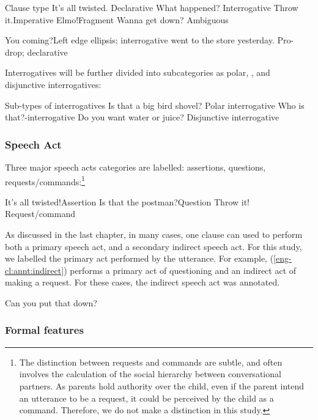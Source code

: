 Clause type
\bxl
\label{eng-cl:annt:decl}
It’s all twisted. \hfill Declarative
\ex \label{eng-cl:annt:int} What happened?	\hfill Interrogative
\ex \label{eng-cl:annt:imp} Throw it.\hfill Imperative
\ex \label{eng-cl:annt:frag}	Elmo!\hfill	Fragment
\ex \label{eng-cl:annt:amb} Wanna get down?	\hfill Ambiguous
\exl
\eex

\bxl{} You coming?\hfill Left edge ellipsis; interrogative
\ex went to the store yesterday. \hfill	Pro-drop; declarative
\exl
\eex

Interrogatives will be further divided into subcategories as polar, \twh, and disjunctive interrogatives:

	Sub-types of interrogatives
\bxl{}
Is that a big bird shovel? \hfill	Polar interrogative
\ex	Who is that?\hfill	\twh-interrogative
\ex	Do you want water or juice? \hfill Disjunctive interrogative
\exl
\eex

\subsubsection{Speech Act}

Three major speech acts categories are labelled: assertions, questions, requests/commands:\footnote{The distinction between requests and commands are subtle, and often involves the calculation of the social hierarchy between conversational partners. As parents hold authority over the child, even if the parent intend an utterance to be a request, it could be perceived by the child as a command. Therefore, we do not make a distinction in this study.}

\bxl{} It’s all twisted!\hfill	Assertion
\ex Is that the postman?\hfill		Question
\ex Throw it!	\hfill		Request/command
\exl
\eex

As discussed in the last chapter, in many cases, one clause can used to perform both a primary speech act, and a secondary indirect speech act. For this study, we labelled the primary act performed by the utterance. For example, (\ref{eng-cl:annt:indirect}) performs a primary act of questioning and an indirect act of making a request. For these cases, the indirect speech act was annotated.

Can you put that down?
\eex 

\subsubsection{Formal features}


